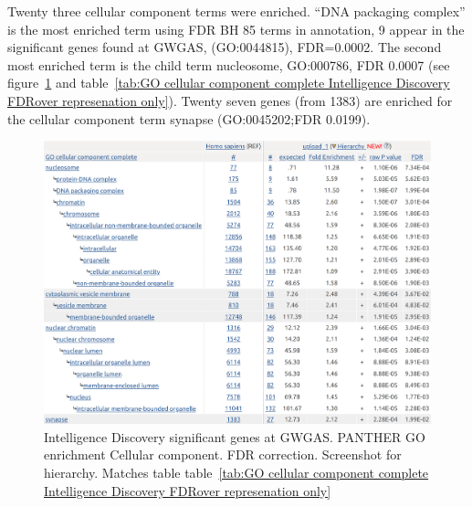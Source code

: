 Twenty three cellular component terms were enriched. ``DNA packaging complex'' is the most enriched term using FDR BH 85 terms in annotation, 9 appear in the significant genes found at GWGAS, (GO:0044815), FDR=0.0002. The second most enriched term is the child term nucleosome, GO:000786, FDR 0.0007 (see figure~\ref{fig:UKBiobank int significant genes at GWGAS. PANTHER GO enrichment Cellular component. FDR correction. Screenshot for hierarchy} and table~\ref{tab:GO cellular component complete Intelligence Discovery FDRover represenation only}). Twenty seven genes (from 1383) are enriched for the cellular component term synapse (GO:0045202;FDR 0.0199).



\begin{figure}
    \centering
    \includegraphics[width=\textwidth]{images/chapter2/strontium/ukbbint_cc.png}
        \caption{Intelligence Discovery significant genes at GWGAS. PANTHER GO enrichment Cellular component. FDR correction. Screenshot for hierarchy. Matches table table~\ref{tab:GO cellular component complete Intelligence Discovery FDRover represenation only} }
    \label{fig:UKBiobank int significant genes at GWGAS. PANTHER GO enrichment Cellular component. FDR correction. Screenshot for hierarchy}
\end{figure}

